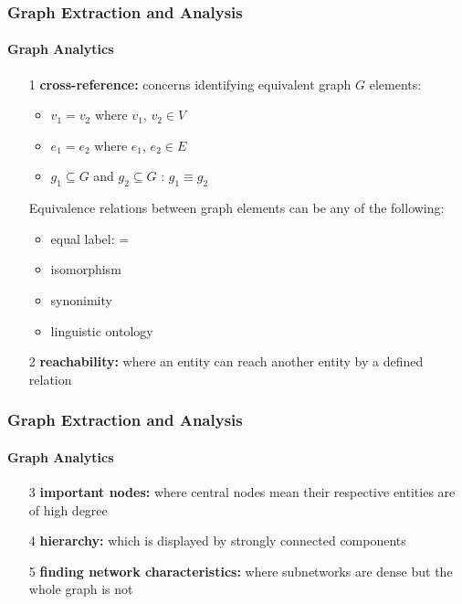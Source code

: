 \documentclass[xcolor=table]{beamer}
\begin{document}

\begin{frame}
\frametitle{Graph Extraction and Analysis}
\framesubtitle{Graph Analytics}
\begin{enumerate}
  \item[1] \textbf{cross-reference:} concerns identifying equivalent graph $G$ elements:
  \begin{itemize}
      \item $v_1 = v_2$ where $v_1$, $v_2 \in V $
      \item $e_1 = e_2$ where $e_1$, $e_2 \in E $
      \item $g_1 \subseteq  G$ and $g_2 \subseteq G$ 
      : $g_1 \equiv  g_2 $
  \end{itemize}
  Equivalence relations between graph elements can be any of the following:
  \begin{itemize}
      \item equal label: =
      \item isomorphism
      \item synonimity
      \item linguistic ontology
  \end{itemize}
  \item[2] \textbf{reachability:} where an entity can reach another entity by a defined relation  %
\end{enumerate}

\end{frame}

\begin{frame}
\frametitle{Graph Extraction and Analysis}
\framesubtitle{Graph Analytics}
\begin{enumerate}
  
  \item[3] \textbf{important nodes: }where central nodes mean their respective entities are of high degree 
   \item[4] \textbf{hierarchy: }which is displayed by strongly connected components
   \item[5] \textbf{finding network characteristics: }where subnetworks are dense but the whole graph is not
\end{enumerate}

\end{frame}
\end{document}
